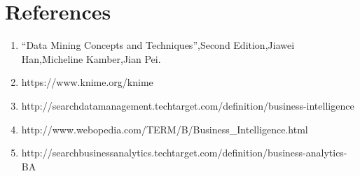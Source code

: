 \documentclass[a4paper,12pt]{article}
\begin{document}
\section{References}

\begin{enumerate}
	\item 	“Data Mining Concepts and Techniques”,Second Edition,Jiawei Han,Micheline Kamber,Jian Pei.
	\item	https://www.knime.org/knime
	\item	http://searchdatamanagement.techtarget.com/definition/business-intelligence
	\item	http://www.webopedia.com/TERM/B/Business\_Intelligence.html
	\item	http://searchbusinessanalytics.techtarget.com/definition/business-analytics-BA	
\end{enumerate}
\end{document}
